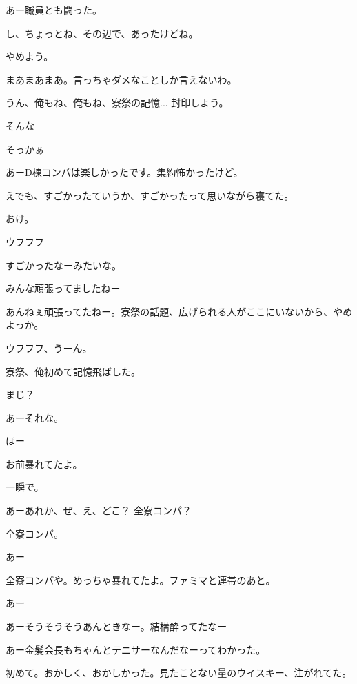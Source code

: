 \begin{multicols}{3}
{        あー職員とも闘った。

        し、ちょっとね、その辺で、あったけどね。

        やめよう。

        まあまあまあ。言っちゃダメなことしか言えないわ。

        うん、俺もね、俺もね、寮祭の記憶... 封印しよう。

        そんな

        そっかぁ

        あーD棟コンパは楽しかったです。集約怖かったけど。

        えでも、すごかったていうか、すごかったって思いながら寝てた。

        おけ。

        ウフフフ

        すごかったなーみたいな。

        みんな頑張ってましたねー

        あんねぇ頑張ってたねー。寮祭の話題、広げられる人がここにいないから、やめよっか。

        ウフフフ、うーん。

        寮祭、俺初めて記憶飛ばした。

        まじ？

        あーそれな。

        ほー

        お前暴れてたよ。

        一瞬で。

        あーあれか、ぜ、え、どこ？ 全寮コンパ？

        全寮コンパ。

        あー

        全寮コンパや。めっちゃ暴れてたよ。ファミマと連帯のあと。

        あー

        あーそうそうそうあんときなー。結構酔ってたなー

        あー金髪会長もちゃんとテニサーなんだなーってわかった。

        初めて。おかしく、おかしかった。見たことない量のウイスキー、注がれてた。

}
\end{multicols}
